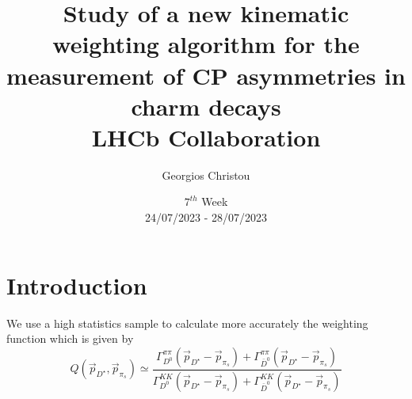 \documentclass{article}
\title{
        \textbf{Study of a new kinematic weighting algorithm for the measurement of CP asymmetries in charm decays}
        \\
        LHCb Collaboration
}
\author{Georgios Christou}
\date{
        $7^{th}$ Week
        \\
        24/07/2023 - 28/07/2023
}
\begin{document}
    \begin{figure}[t]
        \centering
        \hspace{1cm}
    \end{figure}
    \maketitle

    \pagebreak
    
    \section{Introduction}

    We use a high statistics sample to calculate more accurately the weighting function which is given by
    \begin{equation}
        \label{eq:weighting}
        Q(\vec{p}_{D^\star}, \vec{p}_{\pi_s}) \simeq \frac{\Gamma_{D^0}^{\pi\pi}(\vec{p}_{D^\star} - \vec{p}_{\pi_s}) + \Gamma_{\bar{D}^0}^{\pi\pi}(\vec{p}_{D^\star} - \vec{p}_{\pi_s})}{\Gamma_{D^0}^{KK}(\vec{p}_{D^\star} - \vec{p}_{\pi_s}) + \Gamma_{\bar{D}^0}^{KK}(\vec{p}_{D^\star} - \vec{p}_{\pi_s})}
    \end{equation}
\end{document}
